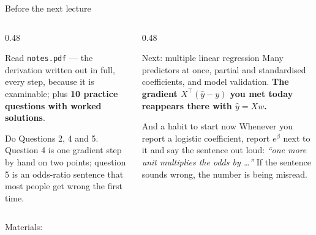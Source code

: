 \documentclass[aspectratio=169]{beamer}
\begin{document}
\begin{frame}[shrink=3]{Before the next lecture}
  \begin{columns}[T]
    \begin{column}{0.48\textwidth}
      \begin{block}{Read}
        \texttt{notes.pdf} --- the derivation written out in full, every
        step, because it is examinable; plus \textbf{10 practice questions
        with worked solutions}.
      \end{block}
      \begin{block}{Do}
        Questions 2, 4 and 5. Question 4 is one gradient step by hand on two
        points; question 5 is an odds-ratio sentence that most people get
        wrong the first time.
      \end{block}
    \end{column}
    \begin{column}{0.48\textwidth}
      \begin{exampleblock}{Next: multiple linear regression}
        Many predictors at once, partial and standardised coefficients, and
        model validation. \textbf{The gradient
        $X^{\!\top}(\hat y - y)$ you met today reappears there with
        $\hat y = Xw$.}
      \end{exampleblock}
      \begin{alertblock}{And a habit to start now}
        Whenever you report a logistic coefficient, report $e^{\beta}$ next
        to it and say the sentence out loud: \emph{``one more unit
        multiplies the odds by \dots''} If the sentence sounds wrong, the
        number is being misread.
      \end{alertblock}
    \end{column}
  \end{columns}
  \begin{center}
    \small Materials: \texttt{\AMLRepoURL}
  \end{center}
  \slidesources{\AMLUnitVSources}
\end{frame}
\end{document}
